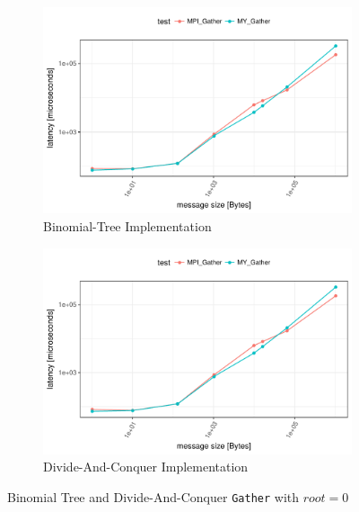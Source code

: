 \begin{figure}[H]
  \centering
  \begin{subfigure}[b]{0.49\textwidth}
        \includegraphics[width=\textwidth]{../benchmarks/openmpi/binom/gather_32/runtime.pdf}
        \caption{Binomial-Tree Implementation}
    \end{subfigure}
    \begin{subfigure}[b]{0.49\textwidth}
        \includegraphics[width=\textwidth]{../benchmarks/openmpi/divide_conquer/gather32/runtime.pdf}
        \caption{Divide-And-Conquer Implementation}
    \end{subfigure}
    \caption{Binomial Tree and Divide-And-Conquer \texttt{Gather} with $root = 0$}
    \label{fig:gather:binom_vs_dac:root0}
\end{figure}

